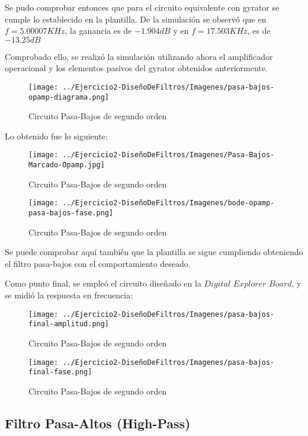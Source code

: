 Se pudo comprobar entonces que para el circuito equivalente con gyrator se cumple lo establecido en la plantilla.
De la simulación se observó que en $f=5.00007 KHz$, la ganancia es de $-1.904 dB$ y en $f=17.503KHz$, es de $-13.25 dB$

Comprobado ello, se realizó la simulación utilizando ahora el amplificador operacional y los elementos pasivos del gyrator obtenidos anteriormente.

\begin{figure}[H]
    \centering
    \texttt{[image: ../Ejercicio2-DiseñoDeFiltros/Imagenes/pasa-bajos-opamp-diagrama.png]}
    \caption{Circuito Pasa-Bajos de segundo orden}
\end{figure}

Lo obtenido fue lo siguiente:

\begin{figure}[H]
    \centering
    \texttt{[image: ../Ejercicio2-DiseñoDeFiltros/Imagenes/Pasa-Bajos-Marcado-Opamp.jpg]}
    \caption{Circuito Pasa-Bajos de segundo orden}
\end{figure}

\begin{figure}[H]
    \centering
    \texttt{[image: ../Ejercicio2-DiseñoDeFiltros/Imagenes/bode-opamp-pasa-bajos-fase.png]}
    \caption{Circuito Pasa-Bajos de segundo orden}
\end{figure}

Se puede comprobar aquí también que la plantilla se sigue cumpliendo obteniendo el filtro pasa-bajos con el comportamiento deseado.

Como punto final, se empleó el circuito diseñado en la $Digital$ $Explorer$ $Board$, y se midió la respuesta en frecuencia:

\begin{figure}[H]
    \centering
    \texttt{[image: ../Ejercicio2-DiseñoDeFiltros/Imagenes/pasa-bajos-final-amplitud.png]}
    \caption{Circuito Pasa-Bajos de segundo orden}
\end{figure}

\begin{figure}[H]
    \centering
    \texttt{[image: ../Ejercicio2-DiseñoDeFiltros/Imagenes/pasa-bajos-final-fase.png]}
    \caption{Circuito Pasa-Bajos de segundo orden}
\end{figure}

\subsection{Filtro Pasa-Altos (High-Pass)}

